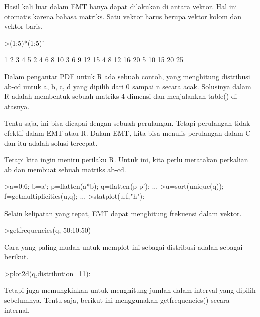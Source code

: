 \documentclass{article}
\begin{document}
\begin{eulernotebook}
\begin{eulercomment}
Hasil kali luar dalam EMT hanya dapat dilakukan di antara vektor. Hal
ini otomatis karena bahasa matriks. Satu vektor harus berupa vektor
kolom dan vektor baris.
\end{eulercomment}
\begin{eulerprompt}
>(1:5)*(1:5)'
\end{eulerprompt}
\begin{euleroutput}
          1         2         3         4         5 
          2         4         6         8        10 
          3         6         9        12        15 
          4         8        12        16        20 
          5        10        15        20        25 
\end{euleroutput}
\begin{eulercomment}
Dalam pengantar PDF untuk R ada sebuah contoh, yang menghitung
distribusi ab-cd untuk a, b, c, d yang dipilih dari 0 sampai n secara
acak. Solusinya dalam R adalah membentuk sebuah matriks 4 dimensi dan
menjalankan table() di atasnya.

Tentu saja, ini bisa dicapai dengan sebuah perulangan. Tetapi
perulangan tidak efektif dalam EMT atau R. Dalam EMT, kita bisa
menulis perulangan dalam C dan itu adalah solusi tercepat.

Tetapi kita ingin meniru perilaku R. Untuk ini, kita perlu meratakan
perkalian ab dan membuat sebuah matriks ab-cd.
\end{eulercomment}
\begin{eulerprompt}
>a=0:6; b=a'; p=flatten(a*b); q=flatten(p-p'); ...
>u=sort(unique(q)); f=getmultiplicities(u,q); ...
>statplot(u,f,"h"):
\end{eulerprompt}
\begin{eulercomment}
Selain kelipatan yang tepat, EMT dapat menghitung frekuensi dalam
vektor.
\end{eulercomment}
\begin{eulerprompt}
>getfrequencies(q,-50:10:50)
\end{eulerprompt}
\begin{euleroutput}
  [0,  23,  132,  316,  602,  801,  333,  141,  53,  0]
\end{euleroutput}
\begin{eulercomment}
Cara yang paling mudah untuk memplot ini sebagai distribusi adalah
sebagai berikut.
\end{eulercomment}
\begin{eulerprompt}
>plot2d(q,distribution=11):
\end{eulerprompt}
\begin{eulercomment}
Tetapi juga memungkinkan untuk menghitung jumlah dalam interval yang
dipilih sebelumnya. Tentu saja, berikut ini menggunakan
getfrequencies() secara internal.


\end{eulercomment}
\end{eulernotebook}
\end{document}

